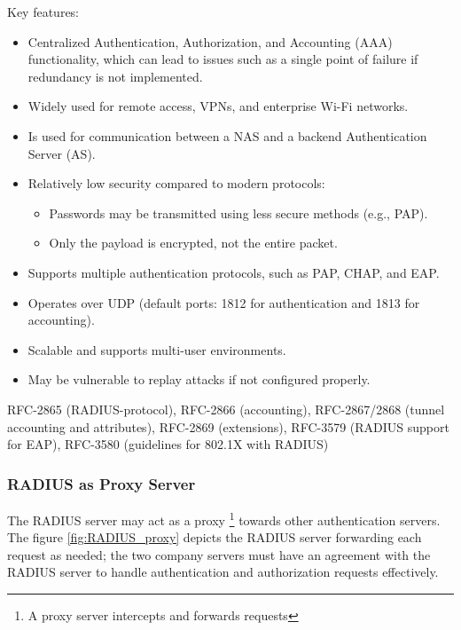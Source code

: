 Key features:
\begin{itemize}
    \item Centralized Authentication, Authorization, and Accounting (AAA) functionality, which can lead to issues such as a single point of failure if redundancy is not implemented.    
    \item Widely used for remote access, VPNs, and enterprise Wi-Fi networks.
    \item Is used for communication between a NAS and a backend Authentication Server (AS).
    \item Relatively low security compared to modern protocols:
    \begin{itemize}
        \item Passwords may be transmitted using less secure methods (e.g., PAP).
        \item Only the payload is encrypted, not the entire packet.
    \end{itemize}
    \item Supports multiple authentication protocols, such as PAP, CHAP, and EAP.
    \item Operates over UDP (default ports: 1812 for authentication and 1813 for accounting).
    \item Scalable and supports multi-user environments.
    \item May be vulnerable to replay attacks if not configured properly.
\end{itemize}

\begin{tcolorbox}[colback=blue!10!white, colframe=blue!50!white, title=Request For Comments (RFC)] 
    RFC-2865 (RADIUS-protocol), RFC-2866 (accounting), RFC-2867/2868 (tunnel accounting and attributes), RFC-2869 (extensions), RFC-3579 (RADIUS support for EAP), RFC-3580 (guidelines for 802.1X with RADIUS)
\end{tcolorbox}

\subsubsection{RADIUS as Proxy Server}
The RADIUS server may act as a proxy \footnote{A proxy server intercepts and forwards requests} towards other authentication servers.
The figure \ref{fig:RADIUS_proxy} depicts the RADIUS server forwarding each request as needed; the two company servers must have an agreement with the RADIUS server to handle authentication and authorization requests effectively.

